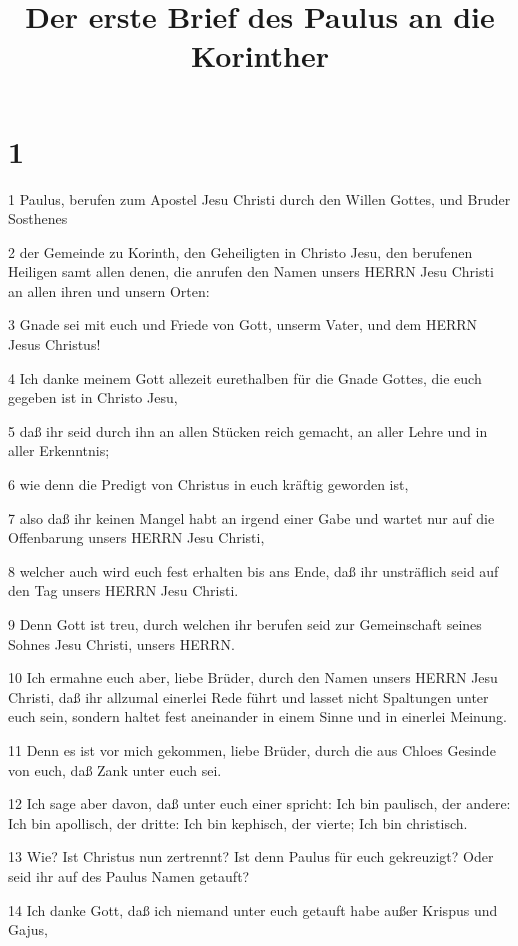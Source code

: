 

\title{Der erste Brief des Paulus an die Korinther}


\chapter{1}

\par 1 Paulus, berufen zum Apostel Jesu Christi durch den Willen Gottes, und Bruder Sosthenes
\par 2 der Gemeinde zu Korinth, den Geheiligten in Christo Jesu, den berufenen Heiligen samt allen denen, die anrufen den Namen unsers HERRN Jesu Christi an allen ihren und unsern Orten:
\par 3 Gnade sei mit euch und Friede von Gott, unserm Vater, und dem HERRN Jesus Christus!
\par 4 Ich danke meinem Gott allezeit eurethalben für die Gnade Gottes, die euch gegeben ist in Christo Jesu,
\par 5 daß ihr seid durch ihn an allen Stücken reich gemacht, an aller Lehre und in aller Erkenntnis;
\par 6 wie denn die Predigt von Christus in euch kräftig geworden ist,
\par 7 also daß ihr keinen Mangel habt an irgend einer Gabe und wartet nur auf die Offenbarung unsers HERRN Jesu Christi,
\par 8 welcher auch wird euch fest erhalten bis ans Ende, daß ihr unsträflich seid auf den Tag unsers HERRN Jesu Christi.
\par 9 Denn Gott ist treu, durch welchen ihr berufen seid zur Gemeinschaft seines Sohnes Jesu Christi, unsers HERRN.
\par 10 Ich ermahne euch aber, liebe Brüder, durch den Namen unsers HERRN Jesu Christi, daß ihr allzumal einerlei Rede führt und lasset nicht Spaltungen unter euch sein, sondern haltet fest aneinander in einem Sinne und in einerlei Meinung.
\par 11 Denn es ist vor mich gekommen, liebe Brüder, durch die aus Chloes Gesinde von euch, daß Zank unter euch sei.
\par 12 Ich sage aber davon, daß unter euch einer spricht: Ich bin paulisch, der andere: Ich bin apollisch, der dritte: Ich bin kephisch, der vierte; Ich bin christisch.
\par 13 Wie? Ist Christus nun zertrennt? Ist denn Paulus für euch gekreuzigt? Oder seid ihr auf des Paulus Namen getauft?
\par 14 Ich danke Gott, daß ich niemand unter euch getauft habe außer Krispus und Gajus,
